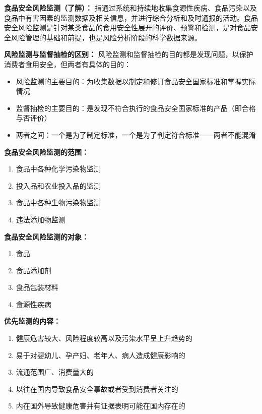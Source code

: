 \begin{defbox}
\textbf{食品安全风险监测（了解）：}
指通过系统和持续地收集食源性疾病、食品污染以及食品中有害因素的监测数据及相关信息，并进行综合分析和及时通报的活动。食品安全风险监测是针对某类食品的食用安全性展开的评价、预警和检测，是对食品安全风险管理的基础和前提，也是风险分析阶段的科学数据来源。

\textbf{风险监测与监督抽检的区别：}
风险监测和监督抽检的目的都是发现问题，以保护消费者食用安全，但两者有具体的目的：
\begin{itemize}[leftmargin=*]
    \item 风险监测的主要目的：为收集数据以制定和修订食品安全国家标准和掌握实际情况
    \item 监督抽检的主要目的：是发现不符合执行的食品安全国家标准的产品（即合格与否评价）
    \item 两者之间：一个是为了制定标准，一个是为了判定符合标准——两者不能混淆
\end{itemize}

\textbf{食品安全风险监测的范围：}
\begin{enumerate}[leftmargin=*]
    \item 食品中各种化学污染物监测
    \item 投入品和农业投入品的监测
    \item 食品中各种生物污染物监测
    \item 违法添加物监测
\end{enumerate}

\textbf{食品安全风险监测的对象：}
\begin{enumerate}[leftmargin=*]
    \item 食品
    \item 食品添加剂
    \item 食品包装材料
    \item 食源性疾病
\end{enumerate}

\textbf{优先监测的内容：}
\begin{enumerate}[leftmargin=*, start=5]
    \item 健康危害较大、风险程度较高以及污染水平呈上升趋势的
    \item 易于对婴幼儿、孕产妇、老年人、病人造成健康影响的
    \item 流通范围广、消费量大的
    \item 以往在国内导致食品安全事故或者受到消费者关注的
    \item {}内在国外导致健康危害并有证据表明可能在国内存在的
\end{enumerate}
\end{defbox}

